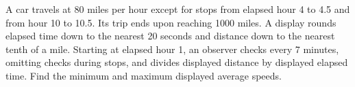 A car travels at 80 miles per hour except for stops from elapsed hour 4 to 4.5 and from hour 10 to 10.5. Its trip ends upon reaching 1000 miles. A display rounds elapsed time down to the nearest 20 seconds and distance down to the nearest tenth of a mile. Starting at elapsed hour 1, an observer checks every 7 minutes, omitting checks during stops, and divides displayed distance by displayed elapsed time. Find the minimum and maximum displayed average speeds.
